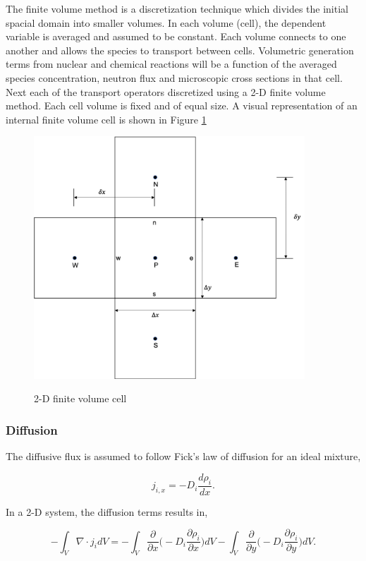 The finite volume method is a discretization technique which divides the initial spacial domain into smaller volumes. In each volume (cell), the dependent variable is averaged and assumed to be constant. Each volume connects to one another and allows the species to transport between cells. Volumetric generation terms from nuclear and chemical reactions will be a function of the averaged species concentration, neutron flux and microscopic cross sections in that cell. Next each of the transport operators discretized using a 2-D finite volume method. Each cell volume is fixed and of equal size. A visual representation of an internal finite volume cell is shown in Figure \ref{fig:2DFiniteVolume}

\begin{figure}[htbp]
  \centering
  \includegraphics[width=4in]{images/chapter-4/2DFiniteVoluem.png}\\
  \caption{2-D finite volume cell}
  \label{fig:2DFiniteVolume}
\end{figure} 
 
\subsubsection{Diffusion}
The diffusive flux is assumed to follow Fick's law of diffusion for an ideal mixture,

\begin{equation}
    j_{i,x} = -D_{i}\frac{d\rho_{i}}{dx}.
\end{equation}

\noindent In a 2-D system, the diffusion terms results in,

\begin{equation}
    -\int_{V}\nabla \cdot j_{i}dV = -\int_{V}\frac{\partial }{\partial x}\bigg( -D_{i}\frac{\partial \rho_{i}}{\partial x}\bigg)dV - \int_{V}\frac{\partial }{\partial y}\bigg( -D_{i}\frac{\partial \rho_{i}}{\partial y}\bigg)dV.
\end{equation}


